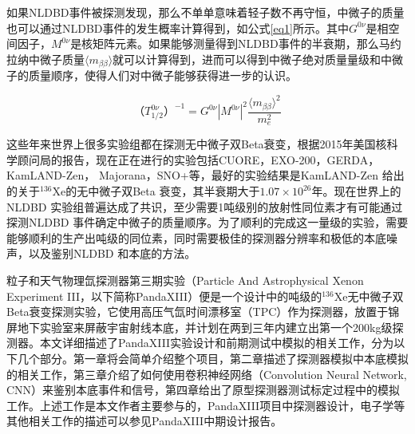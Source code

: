 如果NLDBD事件被探测发现，那么不单单意味着轻子数不再守恒，中微子的质量也可以通过NLDBD事件的发生概率计算得到，如公式\ref{eq1}所示\supercite{avignone2008double}。其中$G^{0\nu}$是相空间因子，$M^{0\nu}$是核矩阵元素。如果能够测量得到NLDBD事件的半衰期，那么马约拉纳中微子质量$\langle m_{\beta\beta}\rangle$就可以计算得到，进而可以得到中微子绝对质量量级和中微子的质量顺序，使得人们对中微子能够获得进一步的认识。

\begin{equation}
    （T_{1/2}^{0\nu}）^{-1}=G^{0\nu}|M^{0\nu}|^2\frac{\langle m_{\beta\beta}\rangle ^2}{m_e^2}
    \label{eq1}
\end{equation}

这些年来世界上很多实验组都在探测无中微子双Beta衰变，根据2015年美国核科学顾问局的报告\supercite{NLDBD_NSAC}，现在正在进行的实验包括CUORE\supercite{Artusa:2014lgv}，EXO-200\supercite{Albert:2014awa}，GERDA\supercite{Agostini:2016iid}，
KamLAND-Zen\supercite{KamLAND-Zen:2016pfg}，
Majorana\supercite{Abgrall:2013rze}，SNO+\supercite{Andringa:2015tza}等，最好的实验结果是KamLAND-Zen
给出的关于$^{136}$Xe的无中微子双Beta
衰变，其半衰期大于$1.07\times10^{26}$年。现在世界上的NLDBD
实验组普遍达成了共识，至少需要1吨级别的放射性同位素才有可能通过探测NLDBD
事件确定中微子的质量顺序。为了顺利的完成这一量级的实验，需要能够顺利的生产出吨级的同位素，同时需要极佳的探测器分辨率和极低的本底噪声，以及鉴别NLDBD
和本底的方法。

粒子和天气物理氙探测器第三期实验（Particle And Astrophysical Xenon Experiment III，以下简称PandaXIII）便是一个设计中的吨级的$^{136}$Xe无中微子双Beta衰变探测实验，它使用高压气氙时间漂移室（TPC）作为探测器，放置于锦屏地下实验室来屏蔽宇宙射线本底，并计划在两到三年内建立出第一个200kg级探测器。本文详细描述了PandaXIII实验设计和前期测试中模拟的相关工作，分为以下几个部分。第一章将会简单介绍整个项目，第二章描述了探测器模拟中本底模拟的相关工作，第三章介绍了如何使用卷积神经网络（Convolution Neural Network, CNN）来鉴别本底事件和信号，第四章给出了原型探测器测试标定过程中的模拟工作。上述工作是本文作者主要参与的，PandaXIII项目中探测器设计，电子学等其他相关工作的描述可以参见PandaXIII中期设计报告\supercite{cdr}。

